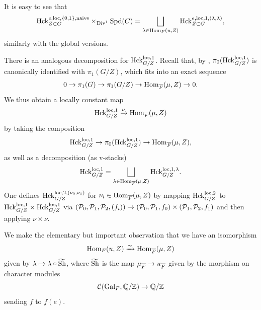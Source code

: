 \begin{rque}\label{rque:naivereform}
It is easy to see that 
\begin{equation*}
\mathrm{Hck}^{e,\mathrm{loc},\{0,1\},\textnormal{naive}}_{Z \subset G} \times_{\mathrm{Div}^{1}} \mathrm{Spd}(C) = \bigsqcup_{\lambda \in \mathrm{Hom}_{F}(u,Z)} \mathrm{Hck}_{Z \subset G}^{e,\mathrm{loc},1,(\lambda,\lambda)},
\end{equation*}
similarly with the global versions.
\end{rque}

There is an analogous decomposition for $\mathrm{Hck}_{G/Z}^{\mathrm{loc},1}$. Recall that, by \cite[Proposition 21.1.4]{SW20}, $\pi_{0}(\mathrm{Hck}^{\mathrm{loc},1}_{G/Z})$ is canonically identified with $\pi_{1}(G/Z)$, which fits into an exact sequence
\begin{equation*}
    0 \to \pi_{1}(G) \to \pi_{1}(G/Z) \to \mathrm{Hom}_{\overline{F}}(\mu,Z) \to 0.
\end{equation*}
We thus obtain a locally constant map
\begin{equation*}
\mathrm{Hck}^{\mathrm{loc},1}_{G/Z} \xrightarrow{\nu} \mathrm{Hom}_{\overline{F}}(\mu, Z)
\end{equation*}
by taking the composition
\begin{equation*}
\mathrm{Hck}^{\mathrm{loc},1}_{G/Z} \to \pi_{0}(\mathrm{Hck}^{\mathrm{loc},1}_{G/Z}) \to \mathrm{Hom}_{\overline{F}}(\mu,Z),
\end{equation*}
as well as a decomposition (as v-stacks)
\begin{equation*}
\mathrm{Hck}^{\mathrm{loc},1}_{G/Z} = \bigsqcup_{\lambda \in \mathrm{Hom}_{\overline{F}}(\mu, Z)} \mathrm{Hck}^{\mathrm{loc},1,\lambda}_{G/Z}.
\end{equation*}
One defines $\mathrm{Hck}^{\mathrm{loc},2,(\nu_{0},\nu_{1})}_{G/Z}$ for $\nu_{i} \in \mathrm{Hom}_{\overline{F}}(\mu,Z)$ by mapping $\mathrm{Hck}^{\mathrm{loc},2}_{G/Z}$ to $\mathrm{Hck}^{\mathrm{loc},1}_{G/Z} \times \mathrm{Hck}^{\mathrm{loc},1}_{G/Z}$ via $(\mathcal{P}_{0},\mathcal{P}_{1},\mathcal{P}_{2},(f_{i})) \mapsto (\mathcal{P}_{0},\mathcal{P}_{1},f_{0}) \times (\mathcal{P}_{1},\mathcal{P}_{2},f_{1})$ and then applying $\nu \times \nu$. 

We make the elementary but important observation that we have an isomorphism
\begin{equation}\label{eq:utomu}
    \mathrm{Hom}_{F}(u,Z) \xrightarrow{\sim} \mathrm{Hom}_{\overline{F}}(\mu,Z)
\end{equation}
given by $\lambda \mapsto \lambda \circ \widetilde{\textnormal{Sh}}$, where $\widetilde{\textnormal{Sh}}$ is the map $\mu_{\overline{F}} \to u_{\overline{F}}$ given by the morphism on character modules 
\begin{equation*}
    \mathcal{C}(\mathrm{Gal}_{F}, \mathbb{Q}/\mathbb{Z}) \to \mathbb{Q}/\mathbb{Z}
\end{equation*}
sending $f$ to $f(e)$.

